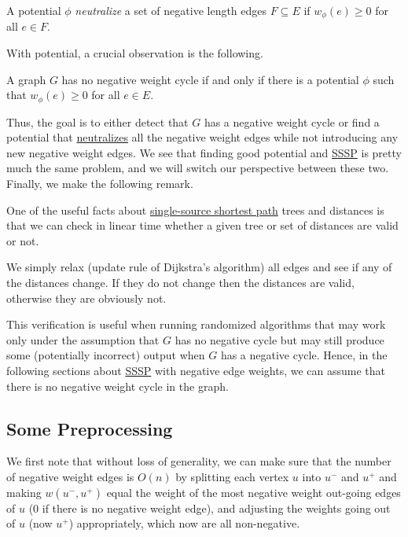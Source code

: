 \begin{definition}[Neutralize]\label{def:neutralize}
	A potential \(\phi \) \emph{neutralize} a set of negative length edges \(F \subseteq E\) if \(w_{\phi } (e) \geq 0\) for all \(e \in F\).
\end{definition}

With potential, a crucial observation is the following.

\begin{lemma}\label{lma:negative-cycle}
	A graph \(G\) has no negative weight cycle if and only if there is a potential \(\phi \) such that \(w_{\phi } (e) \geq 0\) for all \(e \in E\).
\end{lemma}

Thus, the goal is to either detect that \(G\) has a negative weight cycle or find a potential that \hyperref[def:neutralize]{neutralizes} all the negative weight edges while not introducing any new negative weight edges. We see that finding good potential and \hyperref[prb:SSSP]{SSSP} is pretty much the same problem, and we will switch our perspective between these two. Finally, we make the following remark.

\begin{claim}[Verification]\label{clm:SSSP-verfication}
	One of the useful facts about \hyperref[prb:SSSP]{single-source shortest path} trees and distances is that we can check in linear time whether a given tree or set of distances are valid or not.
\end{claim}
\begin{explanation}
	We simply relax (update rule of Dijkstra's algorithm) all edges and see if any of the distances change. If they do not change then the distances are valid, otherwise they are obviously not.
\end{explanation}

This verification is useful when running randomized algorithms that may work only under the assumption that \(G\) has no negative cycle but may still produce some (potentially incorrect) output when \(G\) has a negative cycle. Hence, in the following sections about \hyperref[prb:SSSP]{SSSP} with negative edge weights, we can assume that there is no negative weight cycle in the graph.

\subsection{Some Preprocessing}
We first note that without loss of generality, we can make sure that the number of negative weight edges is \(O(n)\) by splitting each vertex \(u\) into \(u^-\) and \(u^+\) and making \(w(u^-, u^+)\) equal the weight of the most negative weight out-going edges of \(u\) (\(0\) if there is no negative weight edge), and adjusting the weights going out of \(u\) (now \(u^+\)) appropriately, which now are all non-negative.

